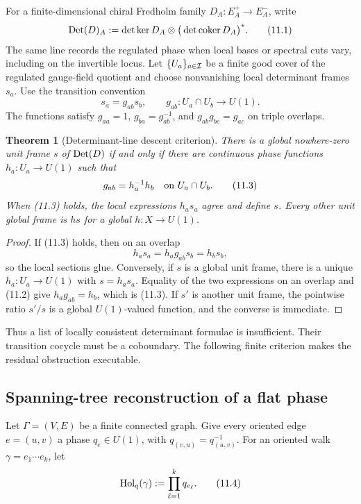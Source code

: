 \documentclass[11pt]{article}
\newtheorem{theorem}{Theorem}[section]
\theoremstyle{remark}
\begin{document}
For a finite-dimensional chiral Fredholm family \(D_A:E_A^+\to E_A^-\),
write
\[
 {\rm Det}(D)_A
 :=\det\ker D_A\otimes\big(\det\operatorname{coker}D_A\big)^*.
                                                               \tag{11.1}
\]
The same line records the regulated phase when local bases or spectral
cuts vary, including on the invertible locus.  Let
\(\{U_a\}_{a\in{\cal I}}\) be a finite good cover of the regulated
gauge-field quotient and choose nonvanishing local determinant frames
\(s_a\).  Use the transition convention
\[
 s_a=g_{ab}s_b,\qquad g_{ab}:U_a\cap U_b\longrightarrow U(1).
                                                               \tag{11.2}
\]
The functions satisfy \(g_{aa}=1\), \(g_{ba}=g_{ab}^{-1}\), and
\(g_{ab}g_{bc}=g_{ac}\) on triple overlaps.

\begin{theorem}[Determinant-line descent criterion]
\label{thm:v19v8-cech}
There is a global nowhere-zero unit frame \(s\) of \({\rm Det}(D)\) if and
only if there are continuous phase functions
\(h_a:U_a\to U(1)\) such that
\[
 g_{ab}=h_a^{-1}h_b\quad\hbox{on }U_a\cap U_b.                 \tag{11.3}
\]
When (11.3) holds, the local expressions \(h_as_a\) agree and define
\(s\).  Every other unit global frame is \(hs\) for a global
\(h:X\to U(1)\).
\end{theorem}

\begin{proof}
If (11.3) holds, then on an overlap
\[
 h_as_a=h_ag_{ab}s_b=h_b s_b,
\]
so the local sections glue.  Conversely, if \(s\) is a global unit frame,
there is a unique \(h_a:U_a\to U(1)\) with \(s=h_as_a\).
Equality of the two expressions on an overlap and (11.2) give
\(h_ag_{ab}=h_b\), which is (11.3).  If \(s'\) is another unit frame, the
pointwise ratio \(s'/s\) is a global \(U(1)\)-valued function, and the
converse is immediate.
\end{proof}

Thus a list of locally consistent determinant formulae is insufficient.
Their transition cocycle must be a coboundary.  The following finite
criterion makes the residual obstruction executable.

\subsection{Spanning-tree reconstruction of a flat phase}

Let \(\Gamma=(V,E)\) be a finite connected graph.  Give every oriented edge
\(e=(u,v)\) a phase \(q_e\in U(1)\), with
\(q_{(v,u)}=q_{(u,v)}^{-1}\).  For an oriented walk
\(\gamma=e_1\cdots e_k\), let
\[
 {\rm Hol}_q(\gamma):=\prod_{\ell=1}^kq_{e_\ell}.              \tag{11.4}
\]
\end{document}

